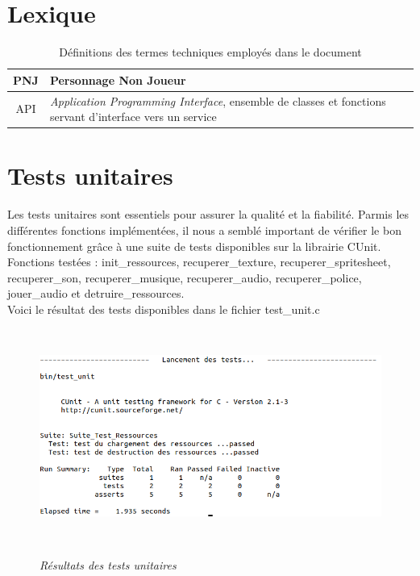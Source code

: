 \documentclass[a4paper,12pt]{article}
\begin{document}
\newpage
\appendix

\section{Lexique}

\begin{table}[h]
    \centering
    \begin{tabular}{c p{}}
	\toprule
	PNJ		    & Personnage Non Joueur \\
	\midrule
	API \label{def_api} & \textit{Application Programming Interface}, ensemble de classes et fonctions servant d’interface vers un service \\
	\bottomrule
    \end{tabular}
    \caption{Définitions des termes techniques employés dans le document}
\end{table}



\section{Tests unitaires}
Les tests unitaires sont essentiels pour assurer la qualité et la fiabilité. Parmis les différentes fonctions implémentées, il nous a semblé important de vérifier le bon fonctionnement grâce à une suite de tests disponibles sur la librairie CUnit.\\
Fonctions testées : init\_ressources, recuperer\_texture, recuperer\_spritesheet, recuperer\_son, recuperer\_musique, recuperer\_audio, recuperer\_police, jouer\_audio et detruire\_ressources.\\
Voici le résultat des tests disponibles dans le fichier test\_unit.c\\

\begin{figure}[h]
	\begin{center}
		\includegraphics[height=7cm]{img/capture_tests.png}\\
		\caption{{\emph{Résultats des tests unitaires}}}
		\label{tests}
	\end{center}
\end{figure}
\end{document}

